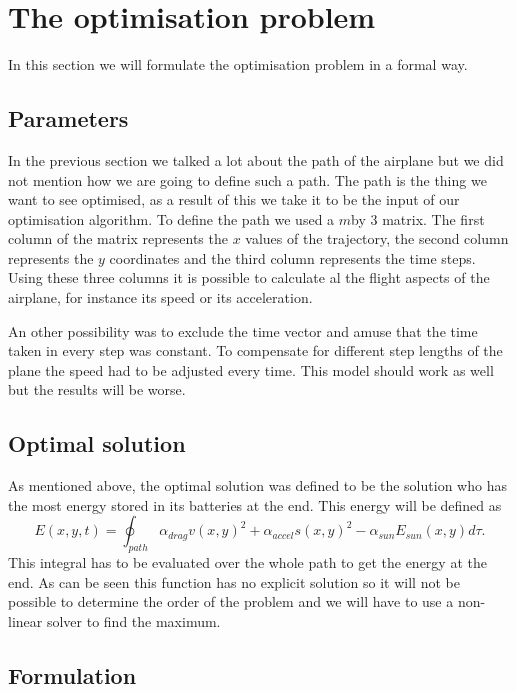 \section{The optimisation problem}


In this section we will formulate the optimisation problem in a formal way.


\subsection{Parameters}

In the previous section we talked a lot about the path of the airplane but we did not mention how we are going to define such a path.
The path is the thing we want to see optimised, as a result of this we take it to be the input of our optimisation algorithm.
To define the path we used a $ m $by 3 matrix.
The first column of the matrix represents the $ x $ values of the trajectory, the second column represents the $ y $ coordinates and the third column represents the time steps.
Using these three columns it is possible to calculate al the flight aspects of the airplane, for instance its speed or its acceleration.

An other possibility was to exclude the time vector and amuse that the time taken in every step was constant.
To compensate for different step lengths of the plane the speed had to be adjusted every time.
This model should work as well but the results will be worse.

\subsection{Optimal solution}

As mentioned above, the optimal solution was defined to be the solution who has the most energy stored in its batteries at the end.
This energy will be defined as
\begin{equation}
E(x,y,t) = \oint_{path} \alpha_{drag}v(x,y)^2  + \alpha_{accel}  s(x,y)^2   -\alpha_{sun} E_{sun}(x,y)  d\tau.
\end{equation}
This integral has to be evaluated over the whole path to get the energy at the end.
As  can be seen this function has no explicit solution so it will not be possible to determine the order of the problem and we will have to use a non-linear solver to find the maximum.

\subsection{Formulation}

